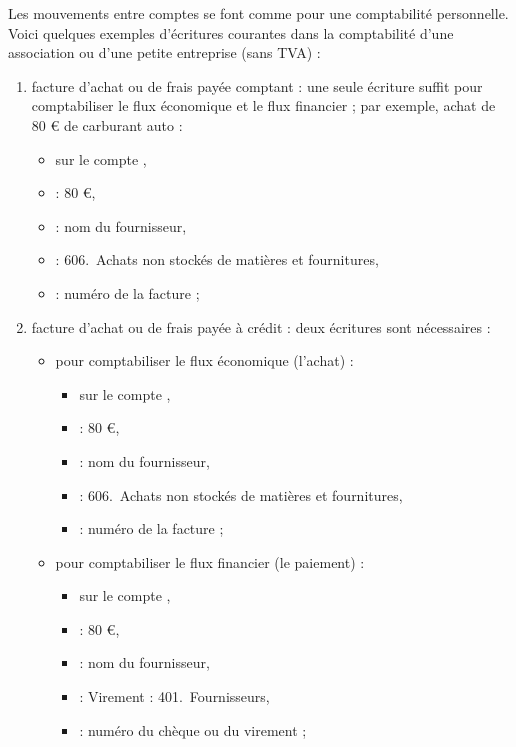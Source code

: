 Les mouvements entre comptes se font comme pour une comptabilité personnelle. Voici quelques exemples d'écritures courantes dans la comptabilité d'une association ou d'une petite entreprise (sans TVA) :

\begin{enumerate}
	\item facture d'achat ou de frais payée comptant : une seule écriture suffit pour comptabiliser le flux économique et le flux financier ; par exemple, achat de 80 € de carburant auto :
		\begin{itemize}
			\item sur le compte ,
			\item {} : 80 €,					
			\item {} : nom du fournisseur,
			\item {} : 606.~Achats non stockés de matières et fournitures,
			\item {} : numéro de la facture ;
		\end{itemize}
	\item facture d'achat ou de frais payée à crédit : deux écritures sont nécessaires :
		\begin{itemize}
			\item pour comptabiliser le flux économique (l'achat) :
				\begin{itemize}
					\item sur le compte ,
					\item {} : 80 €,					
					\item {} : nom du fournisseur,
					\item {} : 606.~Achats non stockés de matières et fournitures,
					\item {} : numéro de la facture ;
				\end{itemize}			
			\item pour comptabiliser le flux financier (le paiement) :
				\begin{itemize}
					\item sur le compte ,
					\item {} : 80 €,					
					\item {} : nom du fournisseur,
					\item {} : Virement : 401.~Fournisseurs,
					\item {} : numéro du chèque ou du virement ;

\end{itemize}
\end{itemize}
\end{enumerate}
